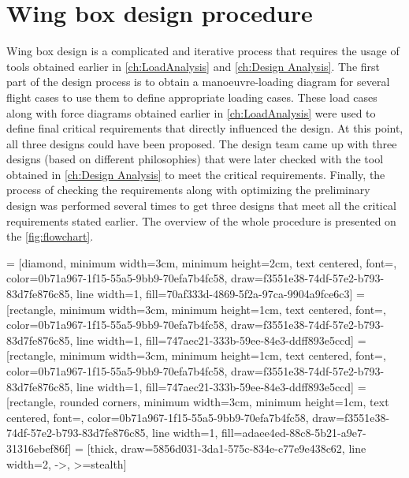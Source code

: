 \section{Wing box design procedure}
\label{sec:design procedure}
Wing box design is a complicated and iterative process that requires the usage of tools obtained earlier in \autoref{ch:LoadAnalysis} and \autoref{ch:Design Analysis}. The first part of the design process is to obtain a manoeuvre-loading diagram for several flight cases to use them to define appropriate loading cases. These load cases along with force diagrams obtained earlier in \autoref{ch:LoadAnalysis} were used to define final critical requirements that directly influenced the design. At this point, all three designs could have been proposed. The design team came up with three designs (based on different philosophies) that were later checked with the tool obtained in \autoref{ch:Design Analysis} to meet the critical requirements. Finally, the process of checking the requirements along with optimizing the preliminary design was performed several times to get three designs that meet all the critical requirements stated earlier. The overview of the whole procedure is presented on the \autoref{fig:flowchart}.




\usetikzlibrary{shapes.geometric, arrows}




 = [diamond, minimum width=3cm, minimum height=2cm, text centered, font=\large, color=0b71a967-1f15-55a5-9bb9-70efa7b4fc58, draw=f3551e38-74df-57e2-b793-83d7fe876c85, line width=1, fill=70af333d-4869-5f2a-97ca-9904a9fce6c3]
 = [rectangle, minimum width=3cm, minimum height=1cm, text centered, font=\normalsize, color=0b71a967-1f15-55a5-9bb9-70efa7b4fc58, draw=f3551e38-74df-57e2-b793-83d7fe876c85, line width=1, fill=747aec21-333b-59ee-84e3-ddff893e5ccd]
 = [rectangle, minimum width=3cm, minimum height=1cm, text centered, font=\normalsize, color=0b71a967-1f15-55a5-9bb9-70efa7b4fc58, draw=f3551e38-74df-57e2-b793-83d7fe876c85, line width=1, fill=747aec21-333b-59ee-84e3-ddff893e5ccd]
 = [rectangle, rounded corners, minimum width=3cm, minimum height=1cm, text centered, font=\normalsize, color=0b71a967-1f15-55a5-9bb9-70efa7b4fc58, draw=f3551e38-74df-57e2-b793-83d7fe876c85, line width=1, fill=adaee4ed-88c8-5b21-a9e7-31316ebef86f]
 = [thick, draw=5856d031-3da1-575c-834e-c77e9e438c62, line width=2, ->, >=stealth]


